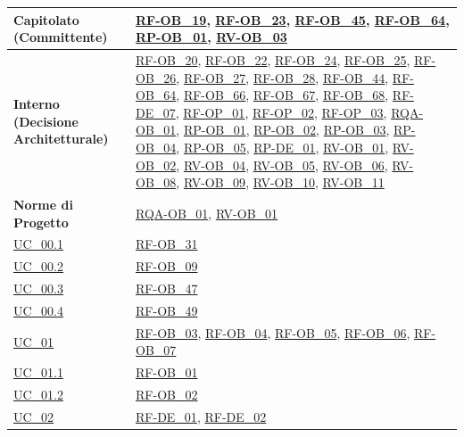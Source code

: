 \begin{longtable}{|>{\raggedright}p{}|>{\raggedright\arraybackslash}p{}|}
    \hline
    \textbf{Capitolato (Committente)} & \hyperlink{rf-ob_19}{RF-OB\_19}, \hyperlink{rf-ob_23}{RF-OB\_23}, \hyperlink{rf-ob_45}{RF-OB\_45}, \hyperlink{rf-ob_64}{RF-OB\_64}, \hyperlink{rp-ob_1}{RP-OB\_01}, \hyperlink{rv-ob_3}{RV-OB\_03} \\
    \hline
    \textbf{Interno (Decisione Architetturale)} & \hyperlink{rf-ob_20}{RF-OB\_20}, \hyperlink{rf-ob_22}{RF-OB\_22}, \hyperlink{rf-ob_24}{RF-OB\_24}, \hyperlink{rf-ob_25}{RF-OB\_25}, \hyperlink{rf-ob_26}{RF-OB\_26}, \hyperlink{rf-ob_27}{RF-OB\_27}, \hyperlink{rf-ob_28}{RF-OB\_28}, \hyperlink{rf-ob_44}{RF-OB\_44}, \hyperlink{rf-ob_64}{RF-OB\_64}, \hyperlink{rf-ob_66}{RF-OB\_66}, \hyperlink{rf-ob_67}{RF-OB\_67}, \hyperlink{rf-ob_68}{RF-OB\_68}, \hyperlink{rf-de_7}{RF-DE\_07}, \hyperlink{rf-op_1}{RF-OP\_01}, \hyperlink{rf-op_2}{RF-OP\_02}, \hyperlink{rf-op_3}{RF-OP\_03}, \hyperlink{rqa-ob_1}{RQA-OB\_01}, \hyperlink{rp-ob_1}{RP-OB\_01}, \hyperlink{rp-ob_2}{RP-OB\_02}, \hyperlink{rp-ob_3}{RP-OB\_03}, \hyperlink{rp-ob_4}{RP-OB\_04}, \hyperlink{rp-ob_5}{RP-OB\_05}, \hyperlink{rp-de_1}{RP-DE\_01}, \hyperlink{rv-ob_1}{RV-OB\_01}, \hyperlink{rv-ob_2}{RV-OB\_02}, \hyperlink{rv-ob_4}{RV-OB\_04}, \hyperlink{rv-ob_5}{RV-OB\_05}, \hyperlink{rv-ob_6}{RV-OB\_06}, \hyperlink{rv-ob_8}{RV-OB\_08}, \hyperlink{rv-ob_9}{RV-OB\_09}, \hyperlink{rv-ob_10}{RV-OB\_10}, \hyperlink{rv-ob_11}{RV-OB\_11} \\
    \hline
    \textbf{Norme di Progetto} & \hyperlink{rqa-ob_1}{RQA-OB\_01}, \hyperlink{rv-ob_1}{RV-OB\_01} \\
    \hline
    \hyperref[uc_00.1]{UC\_00.1} & \hyperlink{rf-ob_31}{RF-OB\_31} \\
    \hline
    \hyperref[uc_00.2]{UC\_00.2} & \hyperlink{rf-ob_9}{RF-OB\_09} \\
    \hline
    \hyperref[uc_00.3]{UC\_00.3} & \hyperlink{rf-ob_47}{RF-OB\_47} \\
    \hline
    \hyperref[uc_00.4]{UC\_00.4} & \hyperlink{rf-ob_49}{RF-OB\_49} \\
    \hline
    \hyperref[uc_01]{UC\_01} & \hyperlink{rf-ob_3}{RF-OB\_03}, \hyperlink{rf-ob_4}{RF-OB\_04}, \hyperlink{rf-ob_5}{RF-OB\_05}, \hyperlink{rf-ob_6}{RF-OB\_06}, \hyperlink{rf-ob_7}{RF-OB\_07} \\
    \hline
    \hyperref[uc_01.1]{UC\_01.1} & \hyperlink{rf-ob_1}{RF-OB\_01} \\
    \hline
    \hyperref[uc_01.2]{UC\_01.2} & \hyperlink{rf-ob_2}{RF-OB\_02} \\
    \hline
    \hyperref[uc_02]{UC\_02} & \hyperlink{rf-de_1}{RF-DE\_01}, \hyperlink{rf-de_2}{RF-DE\_02} \\

\end{longtable}
